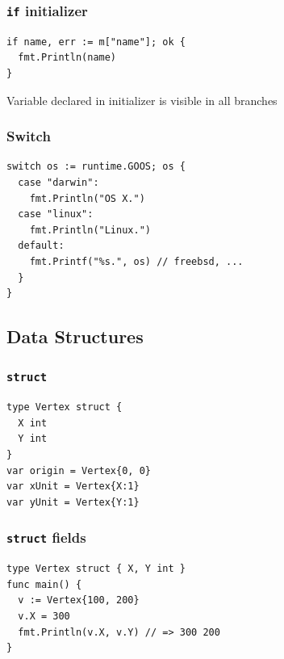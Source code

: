 \documentclass[xetex,mathserif,serif,12pt]{beamer}
\begin{document}
\begin{frame}[fragile]
  \frametitle{\texttt{if} initializer}

  \begin{beamer@nomargin}
    \begin{lstlisting}
if name, err := m["name"]; ok {
  fmt.Println(name)
}
    \end{lstlisting}
  \end{beamer@nomargin}

  Variable declared in initializer is visible in all branches
\end{frame}

\begin{frame}[fragile]
  \frametitle{Switch}

  \begin{beamer@nomargin}
    \begin{lstlisting}
switch os := runtime.GOOS; os {
  case "darwin":
    fmt.Println("OS X.")
  case "linux":
    fmt.Println("Linux.")
  default:
    fmt.Printf("%s.", os) // freebsd, ...
  }
}
    \end{lstlisting}
  \end{beamer@nomargin}
\end{frame}

\subsection{Data Structures}

\begin{frame}[fragile]
  \frametitle{\texttt{struct}}

  \begin{beamer@nomargin}
    \begin{lstlisting}
type Vertex struct {
  X int
  Y int
}
var origin = Vertex{0, 0}
var xUnit = Vertex{X:1}
var yUnit = Vertex{Y:1}
    \end{lstlisting}
  \end{beamer@nomargin}
\end{frame}

\begin{frame}[fragile]
  \frametitle{\texttt{struct} fields}

  \begin{beamer@nomargin}
    \begin{lstlisting}
type Vertex struct { X, Y int }
func main() {
  v := Vertex{100, 200}
  v.X = 300
  fmt.Println(v.X, v.Y) // => 300 200
}
    \end{lstlisting}
  \end{beamer@nomargin}
\end{frame}
\end{document}
